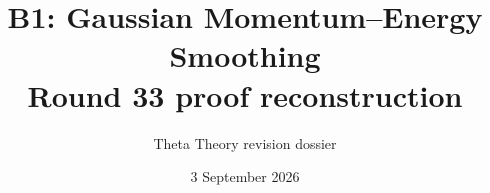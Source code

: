 \documentclass[11pt]{article}
\title{B1: Gaussian Momentum--Energy Smoothing\\\large Round 33 proof reconstruction}
\author{Theta Theory revision dossier}
\date{3 September 2026}
\begin{document}
\maketitle
\reviewnote

\end{document}
